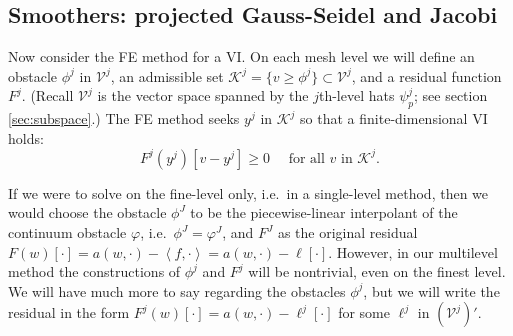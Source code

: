 \documentclass[letterpaper,final,12pt,reqno]{amsart}
\theoremstyle{claim}
\newcommand{\ip}[2]{\left<#1,#2\right>}
\numberwithin{equation}{section}
\numberwithin{figure}{section}
\numberwithin{table}{section}
\numberwithin{theorem}{section}
\begin{document}
\subsection{Smoothers: projected Gauss-Seidel and Jacobi} \label{subsec:obstaclesmoothers}  Now consider the FE method for a VI.  On each mesh level we will define an obstacle $\phi^j$ in $\mathcal{V}^j$, an admissible set $\mathcal{K}^j = \{v \ge \phi^j\} \subset \mathcal{V}^j$, and a residual function $F^j$.  (Recall $\mathcal{V}^j$ is the vector space spanned by the $j$th-level hats $\psi_p^j$; see section \ref{sec:subspace}.)  The FE method seeks $y^j$ in $\mathcal{K}^j$ so that a finite-dimensional VI holds:
\begin{equation}
  F^j(y^j)[v-y^j] \ge 0 \quad \text{ for all } v \text{ in } \mathcal{K}^j. \label{eq:feobstacleviresidual}
\end{equation}

If we were to solve on the fine-level only, i.e.~in a single-level method, then we would choose the obstacle $\phi^J$ to be the piecewise-linear interpolant of the continuum obstacle $\varphi$, i.e.~$\phi^J=\varphi^J$, and $F^J$ as the original residual $F(w)[\cdot] = a(w,\cdot) - \ip{f}{\cdot} = a(w,\cdot) - \ell[\cdot]$.  However, in our multilevel method the constructions of $\phi^j$ and $F^j$ will be nontrivial, even on the finest level.  We will have much more to say regarding the obstacles $\phi^j$, but we will write the residual in the form $F^j(w)[\cdot] = a(w,\cdot) - \ell^j[\cdot]$ for some $\ell^j$ in $(\mathcal{V}^j)'$.
\end{document}
